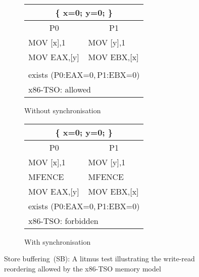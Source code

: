 \begin{figure}[t]
\centering
\ttfamily
\begin{subfigure}[b]{.4\textwidth}
\begin{tabular}[b]{ |l|l| }
\hline
\multicolumn{2}{|c|}{ \{ x=0; y=0; \}} \\ \hline
\multicolumn{1}{|c|}{P0} & \multicolumn{1}{c|}{P1} \\ \hline
MOV [x],1 & MOV [y],1 \\
MOV EAX,[y] & MOV EBX,[x] \\
& \\
\hline
\multicolumn{2}{|l|}{exists (P0:EAX=0,\,P1:EBX=0)} \tabularnewline
\hline
\multicolumn{2}{|l|}{x86-TSO: allowed} \tabularnewline
\hline
\end{tabular}
\caption{Without synchronisation}
\label{simple_wmm_x86:nosync}
\end{subfigure}
\hfill
%
\begin{subfigure}[b]{.4\textwidth}
\begin{tabular}{ |l|l| }
\hline
\multicolumn{2}{|c|}{ \{ x=0; y=0; \}} \\ \hline
\multicolumn{1}{|c|}{P0} & \multicolumn{1}{c|}{P1} \\ \hline
MOV [x],1 & MOV [y],1 \\
MFENCE & MFENCE \\
MOV EAX,[y] & MOV EBX,[x] \\
\hline
\multicolumn{2}{|l|}{exists (P0:EAX=0,\,P1:EBX=0)} \tabularnewline
\hline
\multicolumn{2}{|l|}{x86-TSO: forbidden} \tabularnewline
\hline
\end{tabular}
\caption{With synchronisation}
\label{simple_wmm_x86:sync}
\end{subfigure}
%
\caption{Store buffering~(SB): A litmus test illustrating the write-read reordering allowed by the x86-TSO memory model}
\label{simple_wmm_x86}
\end{figure}

